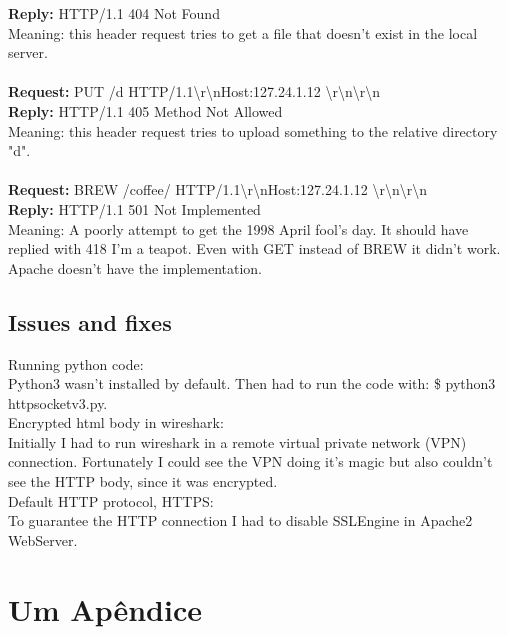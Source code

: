 \documentclass[11pt,a4paper]{report}
\begin{document}
            \textbf{Reply:} HTTP/1.1 404 Not Found \\
                Meaning: this header request tries to get a file that doesn't exist in the local server. \\ \\
            \textbf{Request:} PUT /d HTTP/1.1\textbackslash r\textbackslash nHost:127.24.1.12 \textbackslash r\textbackslash n\textbackslash r\textbackslash n \\
            \textbf{Reply:} HTTP/1.1 405 Method Not Allowed \\
                Meaning: this header request tries to upload something to the relative directory "d". \\ \\
            \textbf{Request:} BREW /coffee/ HTTP/1.1\textbackslash r\textbackslash nHost:127.24.1.12 \textbackslash r\textbackslash n\textbackslash r\textbackslash n \\
            \textbf{Reply:} HTTP/1.1 501 Not Implemented \\
                Meaning: A poorly attempt to get the 1998 April fool's day. It should have replied with 418 I'm a teapot. Even with GET instead of BREW it didn't work. Apache doesn't have the implementation. \\

\section{Issues and fixes}
    Running python code: \\
        Python3 wasn't installed by default. Then had to run the code with: \$ python3 httpsocketv3.py. \\
    Encrypted html body in wireshark: \\
        Initially I had to run wireshark in a remote virtual private network (VPN) connection. Fortunately I could see the VPN doing it's magic but also couldn't see the HTTP body, since it was encrypted. \\
    Default HTTP protocol, HTTPS: \\
        To guarantee the HTTP connection I had to disable SSLEngine in Apache2 WebServer. \\


\renewcommand{\bibname}{Referências bibliográficas}



\appendix
\chapter{Um Apêndice}
\end{document}
